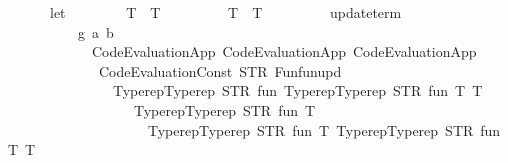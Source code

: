 \begin{isabellebody}
\ \ \ \ \ \ let\isanewline
\ \ \ \ \ \ \ \ T{}\ {\isacharequal}{\kern0pt}\ T{}\ {\isacharparenleft}{\kern0pt}{\isacharparenright}{\kern0pt}{\isacharsemicolon}{\kern0pt}\isanewline
\ \ \ \ \ \ \ \ T{}\ {\isacharequal}{\kern0pt}\ T{}\ {\isacharparenleft}{\kern0pt}{\isacharparenright}{\kern0pt}{\isacharsemicolon}{\kern0pt}\isanewline
\ \ \ \ \ \ \ \ update{\isacharunderscore}{\kern0pt}term\ {\isacharequal}{\kern0pt}\isanewline
\ \ \ \ \ \ \ \ \ \ {\isacharparenleft}{\kern0pt}{\isasymlambda}g\ {\isacharparenleft}{\kern0pt}a{\isacharcomma}{\kern0pt}\ b{\isacharparenright}{\kern0pt}{\isachardot}{\kern0pt}\isanewline
\ \ \ \ \ \ \ \ \ \ \ \ Code{\isacharunderscore}{\kern0pt}Evaluation{\isachardot}{\kern0pt}App\ {\isacharparenleft}{\kern0pt}Code{\isacharunderscore}{\kern0pt}Evaluation{\isachardot}{\kern0pt}App\ {\isacharparenleft}{\kern0pt}Code{\isacharunderscore}{\kern0pt}Evaluation{\isachardot}{\kern0pt}App\isanewline
\ \ \ \ \ \ \ \ \ \ \ \ \ {\isacharparenleft}{\kern0pt}Code{\isacharunderscore}{\kern0pt}Evaluation{\isachardot}{\kern0pt}Const\ {\isacharparenleft}{\kern0pt}STR\ {\isacharprime}{\kern0pt}{\isacharprime}{\kern0pt}Fun{\isachardot}{\kern0pt}fun{\isacharunderscore}{\kern0pt}upd{\isacharprime}{\kern0pt}{\isacharprime}{\kern0pt}{\isacharparenright}{\kern0pt}\isanewline
\ \ \ \ \ \ \ \ \ \ \ \ \ \ \ {\isacharparenleft}{\kern0pt}Typerep{\isachardot}{\kern0pt}Typerep\ {\isacharparenleft}{\kern0pt}STR\ {\isacharprime}{\kern0pt}{\isacharprime}{\kern0pt}fun{\isacharprime}{\kern0pt}{\isacharprime}{\kern0pt}{\isacharparenright}{\kern0pt}\ {\isacharbrackleft}{\kern0pt}Typerep{\isachardot}{\kern0pt}Typerep\ {\isacharparenleft}{\kern0pt}STR\ {\isacharprime}{\kern0pt}{\isacharprime}{\kern0pt}fun{\isacharprime}{\kern0pt}{\isacharprime}{\kern0pt}{\isacharparenright}{\kern0pt}\ {\isacharbrackleft}{\kern0pt}T{}{\isacharcomma}{\kern0pt}\ T{}{\isacharbrackright}{\kern0pt}{\isacharcomma}{\kern0pt}\isanewline
\ \ \ \ \ \ \ \ \ \ \ \ \ \ \ \ \ \ Typerep{\isachardot}{\kern0pt}Typerep\ {\isacharparenleft}{\kern0pt}STR\ {\isacharprime}{\kern0pt}{\isacharprime}{\kern0pt}fun{\isacharprime}{\kern0pt}{\isacharprime}{\kern0pt}{\isacharparenright}{\kern0pt}\ {\isacharbrackleft}{\kern0pt}T{}{\isacharcomma}{\kern0pt}\isanewline
\ \ \ \ \ \ \ \ \ \ \ \ \ \ \ \ \ \ \ \ Typerep{\isachardot}{\kern0pt}Typerep\ {\isacharparenleft}{\kern0pt}STR\ {\isacharprime}{\kern0pt}{\isacharprime}{\kern0pt}fun{\isacharprime}{\kern0pt}{\isacharprime}{\kern0pt}{\isacharparenright}{\kern0pt}\ {\isacharbrackleft}{\kern0pt}T{}{\isacharcomma}{\kern0pt}\ Typerep{\isachardot}{\kern0pt}Typerep\ {\isacharparenleft}{\kern0pt}STR\ {\isacharprime}{\kern0pt}{\isacharprime}{\kern0pt}fun{\isacharprime}{\kern0pt}{\isacharprime}{\kern0pt}{\isacharparenright}{\kern0pt}\ {\isacharbrackleft}{\kern0pt}T{}{\isacharcomma}{\kern0pt}\ T{}{\isacharbrackright}{\kern0pt}{\isacharbrackright}{\kern0pt}{\isacharbrackright}{\kern0pt}{\isacharbrackright}{\kern0pt}{\isacharparenright}{\kern0pt}{\isacharparenright}{\kern0pt}\isanewline

\end{isabellebody}
